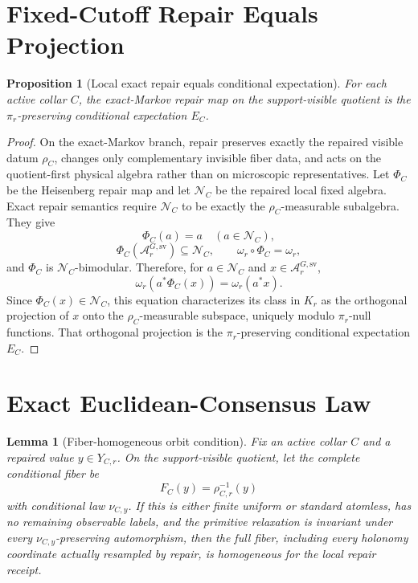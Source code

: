 \documentclass[11pt]{article}
\numberwithin{equation}{section}
\newtheorem{proposition}[theorem]{Proposition}
\newtheorem{lemma}[theorem]{Lemma}
\theoremstyle{remark}
\begin{document}
\section{Fixed-Cutoff Repair Equals Projection}

\begin{proposition}[Local exact repair equals conditional expectation]
\label{prop:local-repair}
For each active collar \(C\), the exact-Markov repair map on the support-visible quotient is the
\(\pi_r\)-preserving conditional expectation \(E_C\).
\end{proposition}

\begin{proof}
On the exact-Markov branch, repair preserves exactly the repaired visible datum \(\rho_C\), changes
only complementary invisible fiber data, and acts on the quotient-first physical algebra rather
than on microscopic representatives. Let \(\Phi_C\) be the Heisenberg repair map and let
\(\mathcal N_C\) be the repaired local fixed algebra. Exact repair semantics require
\(\mathcal N_C\) to be exactly the \(\rho_C\)-measurable subalgebra. They give
\[
\Phi_C(a)=a \quad (a\in\mathcal N_C),
\]
\[
\Phi_C(\mathcal A_r^{G,\mathrm{sv}})\subseteq\mathcal N_C,
\qquad
\omega_r\circ\Phi_C=\omega_r,
\]
and \(\Phi_C\) is \(\mathcal N_C\)-bimodular. Therefore, for \(a\in\mathcal N_C\) and
\(x\in\mathcal A_r^{G,\mathrm{sv}}\),
\[
\omega_r\!\left(a^*\Phi_C(x)\right)=\omega_r(a^*x).
\]
Since \(\Phi_C(x)\in\mathcal N_C\), this equation characterizes its class in \(K_r\) as the
orthogonal projection of \(x\) onto the \(\rho_C\)-measurable subspace, uniquely modulo
\(\pi_r\)-null functions. That orthogonal projection is the \(\pi_r\)-preserving conditional
expectation \(E_C\).
\end{proof}

\section{Exact Euclidean-Consensus Law}

\begin{lemma}[Fiber-homogeneous orbit condition]
\label{lem:fiber-symmetry}
Fix an active collar \(C\) and a repaired value \(y\in Y_{C,r}\). On the support-visible quotient,
let the complete conditional fiber be
\[
F_C(y)=\rho_{C,r}^{-1}(y)
\]
with conditional law \(\nu_{C,y}\). If this is either finite uniform or standard atomless, has no
remaining observable labels, and the primitive relaxation is invariant under every
\(\nu_{C,y}\)-preserving automorphism, then the full fiber, including every holonomy coordinate
actually resampled by repair, is homogeneous for the local repair receipt.
\end{lemma}
\end{document}
